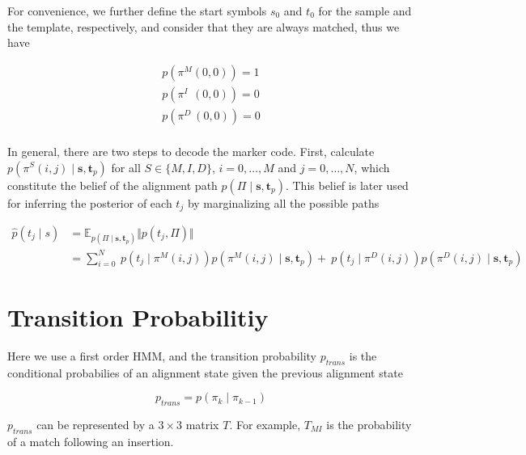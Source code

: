 \documentclass[10pt]{article}
\begin{document}
  For convenience, we further define the start symbols $s_0$ and $t_0$ for the sample and the template, respectively, and consider that they are always matched, thus we have

  \begin{equation} \label{eq001}
    \begin{aligned}
      p\left(\pi^M(0, 0)\right) = 1 \\
      p\left(\pi^{I\;\;}(0, 0)\right) = 0 \\
      p\left(\pi^{D\;}(0, 0)\right) = 0 \\
    \end{aligned}
  \end{equation}

  In general, there are two steps to decode the marker code. First, calculate $p\left(\pi^S(i, j) \;|\; \mathbf{s}, \mathbf{t}_p\right)$ for all $S \in \{M, I, D\}$, $i = 0, \dots, M$ and $j=0, \dots,N$, which constitute the belief of the alignment path $p(\Pi \;|\; \mathbf{s}, \mathbf{t}_p)$. This belief is later used for inferring the posterior of each $t_j$ by marginalizing all the possible paths

  \begin{equation}
  \begin{aligned}
    \hat{p}(t_j \;|\; s) &= \mathbb{E}_{p(\Pi \;|\; \mathbf{s}, \mathbf{t}_p)} \Vert p(t_j, \Pi) \Vert \\
    &= \sum\nolimits_{i=0}^N \
    p\left(t_j \;|\; \pi^M(i, j) \right) p\left(\pi^M(i, j) \;|\; \mathbf{s}, \mathbf{t}_p\right) + \
    p\left(t_j \;|\; \pi^D(i, j) \right) p\left(\pi^D(i, j) \;|\; \mathbf{s}, \mathbf{t}_p\right)
  \end{aligned}
  \end{equation}


\section{Transition Probabilitiy}

  Here we use a first order HMM, and the transition probability $ p_{trans}$ is the conditional probabilies of an alignment state given the previous alignment state

  \begin{equation}
    p_{trans} = p(\pi_k \;|\; \pi_{k-1})
  \end{equation}

  $p_{trans}$ can be represented by a $3 \times 3$ matrix $T$. For example, $T_{MI}$ is the probability of a match following an insertion.
\end{document}
